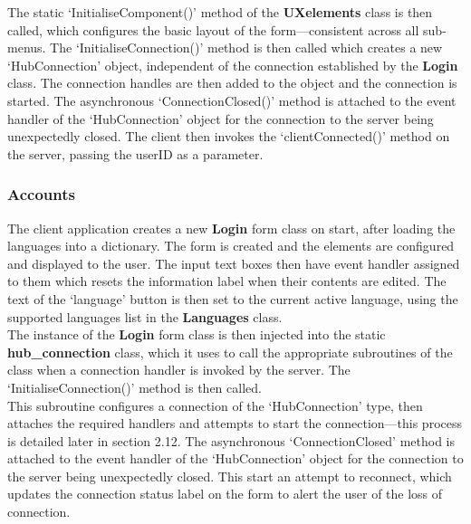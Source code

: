 \documentclass{article}
\begin{document}
The static `InitialiseComponent()' method of the \textbf{UXelements} class is then called, which configures the basic layout of the form---consistent across all sub-menus. The `InitialiseConnection()' method is then called which creates a new `HubConnection' object, independent of the connection established by the \textbf{Login} class. The connection handles are then added to the object and the connection is started. The asynchronous `ConnectionClosed()' method is attached to the event handler of the `HubConnection' object for the connection to the server being unexpectedly closed. The client then invokes the `clientConnected()' method on the server, passing the userID as a parameter.

\subsubsection{Accounts}

The client application creates a new \textbf{Login} form class on start, after loading the languages into a dictionary. The form is created and the elements are configured and displayed to the user. The input text boxes then have event handler assigned to them which resets the information label when their contents are edited. The text of the `language' button is then set to the current active language, using the supported languages list in the \textbf{Languages} class. \\

The instance of the \textbf{Login} form class is then injected into the static \textbf{hub\_connection} class, which it uses to call the appropriate subroutines of the class when a connection handler is invoked by the server. The `InitialiseConnection()' method is then called. \\

This subroutine configures a connection of the `HubConnection' type, then attaches the required handlers and attempts to start the connection---this process is detailed later in section 2.12. The asynchronous `ConnectionClosed' method is attached to the event handler of the `HubConnection' object for the connection to the server being unexpectedly closed. This start an attempt to reconnect, which updates the connection status label on the form to alert the user of the loss of connection. \\
\end{document}
